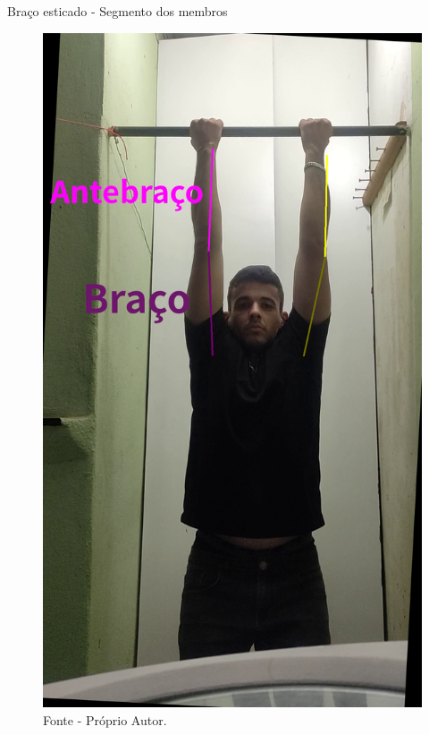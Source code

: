 \begin{frame}{Braço esticado - Segmento dos membros}
    \begin{figure}[!ht]
        \centering
            \includegraphics[scale=0.1]{img/desenvolvimento/bracoEsticado/bracoEsticado.png}
        \caption*{Fonte - Próprio Autor.}
    \end{figure}
\end{frame}

